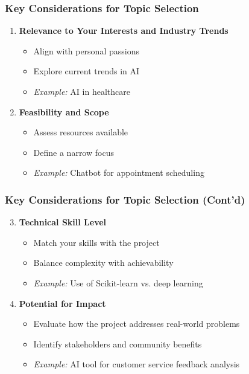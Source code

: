 \documentclass[aspectratio=169]{beamer}
\begin{document}
\begin{frame}[fragile]
    \frametitle{Key Considerations for Topic Selection}
    \begin{enumerate}
        \item \textbf{Relevance to Your Interests and Industry Trends}
        \begin{itemize}
            \item Align with personal passions
            \item Explore current trends in AI
            \item \textit{Example:} AI in healthcare
        \end{itemize}
        
        \item \textbf{Feasibility and Scope}
        \begin{itemize}
            \item Assess resources available
            \item Define a narrow focus
            \item \textit{Example:} Chatbot for appointment scheduling
        \end{itemize}
    \end{enumerate}
\end{frame}

\begin{frame}[fragile]
    \frametitle{Key Considerations for Topic Selection (Cont'd)}
    \begin{enumerate}
        \setcounter{enumi}{2}
        \item \textbf{Technical Skill Level}
        \begin{itemize}
            \item Match your skills with the project
            \item Balance complexity with achievability
            \item \textit{Example:} Use of Scikit-learn vs. deep learning
        \end{itemize}

        \item \textbf{Potential for Impact}
        \begin{itemize}
            \item Evaluate how the project addresses real-world problems
            \item Identify stakeholders and community benefits
            \item \textit{Example:} AI tool for customer service feedback analysis
        \end{itemize}
    \end{enumerate}
\end{frame}
\end{document}
